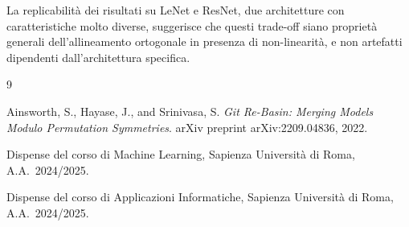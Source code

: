 \documentclass[11pt, a4paper]{article}
\begin{document}
La replicabilità dei risultati su LeNet e ResNet, due architetture con caratteristiche molto diverse, suggerisce che questi trade-off siano proprietà generali dell'allineamento ortogonale in presenza di non-linearità, e non artefatti dipendenti dall'architettura specifica.

\begin{thebibliography}{9}

Ainsworth, S., Hayase, J., and Srinivasa, S.
\textit{Git Re-Basin: Merging Models Modulo Permutation Symmetries}.
arXiv preprint arXiv:2209.04836, 2022.

Dispense del corso di Machine Learning,
Sapienza Università di Roma, A.A.\ 2024/2025.

Dispense del corso di Applicazioni Informatiche,
Sapienza Università di Roma, A.A.\ 2024/2025.

\end{thebibliography}
\end{document}
